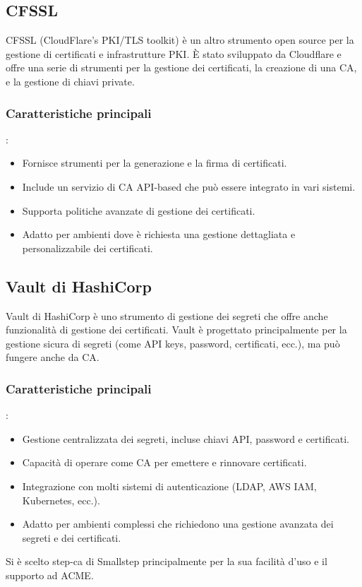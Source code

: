 \documentclass[12pt]{report}
\begin{document}
\subsection{CFSSL}
CFSSL (CloudFlare's PKI/TLS toolkit) è un altro strumento open source per la gestione di certificati e infrastrutture PKI. È stato sviluppato da Cloudflare e offre una serie di strumenti per la gestione dei certificati, la creazione di una CA, e la gestione di chiavi private.

\subsubsection{Caratteristiche principali}:
\begin{itemize}
    \item Fornisce strumenti per la generazione e la firma di certificati.
    \item Include un servizio di CA API-based che può essere integrato in vari sistemi.
    \item Supporta politiche avanzate di gestione dei certificati.
    \item Adatto per ambienti dove è richiesta una gestione dettagliata e personalizzabile dei certificati.
\end{itemize}

\subsection{Vault di HashiCorp}
Vault di HashiCorp è uno strumento di gestione dei segreti che offre anche funzionalità di gestione dei certificati. Vault è progettato principalmente per la gestione sicura di segreti (come API keys, password, certificati, ecc.), ma può fungere anche da CA.

\subsubsection{Caratteristiche principali}:
\begin{itemize}
    \item Gestione centralizzata dei segreti, incluse chiavi API, password e certificati.
    \item Capacità di operare come CA per emettere e rinnovare certificati.
    \item Integrazione con molti sistemi di autenticazione (LDAP, AWS IAM, Kubernetes, ecc.).
    \item Adatto per ambienti complessi che richiedono una gestione avanzata dei segreti e dei certificati.
\end{itemize}
Si è scelto step-ca di Smallstep principalmente per la sua facilità d'uso e il supporto ad ACME.
\end{document}
